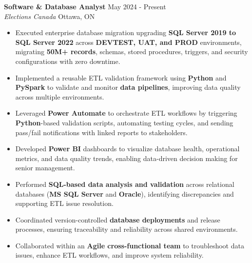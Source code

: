 \documentclass[a4paper]{article}
\begin{document}
\textbf{Software \& Database Analyst} \hfill May 2024 - Present\\
\textit{Elections Canada} \hfill Ottawa, ON\\
\vspace{-2mm}
\begin{itemize} \itemsep -2pt
\item Executed enterprise database migration upgrading \textbf{SQL Server 2019 to SQL Server 2022} across \textbf{DEVTEST, UAT, and PROD} environments, migrating \textbf{50M+ records}, schemas, stored procedures, triggers, and security configurations with zero downtime.

\item Implemented a reusable ETL validation framework using \textbf{Python} and \textbf{PySpark} to validate and monitor \textbf{data pipelines}, improving data quality across multiple environments.

\item Leveraged \textbf{Power Automate} to orchestrate ETL workflows by triggering \textbf{Python}-based validation scripts, automating testing cycles, and sending pass/fail notifications with linked reports to stakeholders.

\item Developed \textbf{Power BI} dashboards to visualize database health, operational metrics, and data quality trends, enabling data-driven decision making for senior management.

\item Performed \textbf{SQL-based data analysis and validation} across relational databases (\textbf{MS SQL Server} and \textbf{Oracle}), identifying discrepancies and supporting ETL issue resolution.

\item Coordinated version-controlled \textbf{database deployments} and release processes, ensuring traceability and reliability across shared environments.

\item Collaborated within an \textbf{Agile cross-functional team} to troubleshoot data issues, enhance ETL workflows, and improve system reliability.
\end{itemize}
\end{document}
